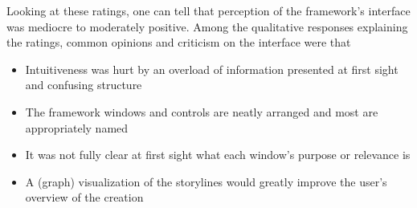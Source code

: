 Looking at these ratings, one can tell that perception of the framework's interface was mediocre to moderately positive. 
Among the qualitative responses explaining the ratings, common opinions and criticism on the interface were that
\begin{itemize}
\item Intuitiveness was hurt by an overload of information presented at first sight and confusing structure
\item The framework windows and controls are neatly arranged and most are appropriately named
\item It was not fully clear at first sight what each window's purpose or relevance is
\item A (graph) visualization of the storylines would greatly improve the user's overview of the creation
\end{itemize}

